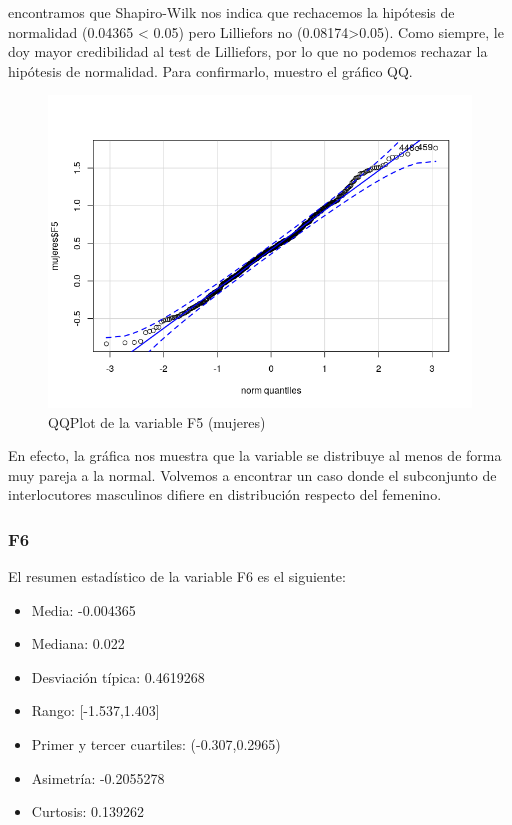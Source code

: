 encontramos que Shapiro-Wilk nos indica que rechacemos la hipótesis de normalidad (0.04365 < 0.05) pero Lilliefors no (0.08174>0.05). Como siempre, le doy mayor credibilidad al test de Lilliefors, por lo que no podemos rechazar la hipótesis de normalidad. Para confirmarlo, muestro el gráfico QQ.

\begin{figure}[H] %
	\centering
	\includegraphics[scale=0.6]{qq-F5m.png}  %
	\caption{QQPlot de la variable F5 (mujeres)} 
	\label{fig:qq-F5m}
\end{figure}

En efecto, la gráfica nos muestra que la variable se distribuye al menos de forma muy pareja a la normal. Volvemos a encontrar un caso donde el subconjunto de interlocutores masculinos difiere en distribución respecto del femenino.

\subsubsection{F6}

El resumen estadístico de la variable F6 es el siguiente:

\begin{itemize}
	\item Media: -0.004365
	\item Mediana: 0.022
	\item Desviación típica: 0.4619268
	\item Rango: [-1.537,1.403]
	\item Primer y tercer cuartiles: (-0.307,0.2965)
	\item Asimetría: -0.2055278
	\item Curtosis: 0.139262
\end{itemize}

